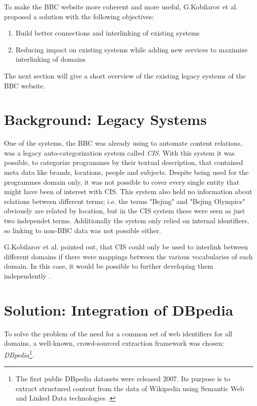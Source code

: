 \documentclass{llncs}
\begin{document}
\vspace{15mm}

To make the BBC website more coherent and more useful, G.Kobilarov et al. proposed a solution \cite{mmsw} with the following objectives:
\begin{enumerate}
  \item Build better connections and interlinking of existing systems
  \item Reducing impact on existing systems while adding new services to maximize interlinking of domains
\end{enumerate}

The next section will give a short overview of the existing legacy systems of the BBC website.

\section{Background: Legacy Systems}

One of the systems, the BBC was already using to automate content relations, was a legacy auto-categorization system called \textit{CIS}. With this system it was possible, to categorize programmes by their textual description, that contained meta data like brands, locations, people and subjects. Despite being used for the programmes domain only, it was not possible to cover every single entity that might have been of interest with CIS. This system also held no information about relations between different terms; i.e. the terms "Bejing" and "Bejing Olympics" obviously are related by location, but in the CIS system these were seen as just two independet terms. Additionally the system only relied on internal identifiers, so linking to non-BBC data was not possible either.

G.Kobilarov et al. pointed out, that CIS could only be used to interlink between different domains if there were mappings between the various vocabularies of each domain. In this case, it would be possible to further developing them independently \cite{mmsw}.

\section{Solution: Integration of DBpedia}

To solve the problem of the need for a common set of web identifiers for all domains, a well-known, crowd-sourced extraction framework was chosen: \textit{DBpedia}\footnote{The first public DBpedia datasets were released 2007. Its purpose is to extract structured content from the data of Wikipedia using Semantic Web and Linked Data technologies \cite{dbpedia}.}.
\end{document}
